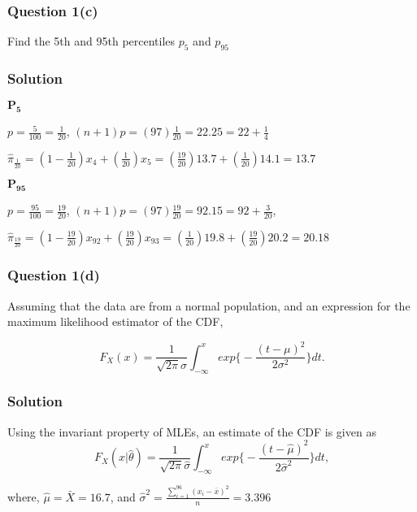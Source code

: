 \documentclass[]{article}
\begin{document}
\hypertarget{question-1c}{%
\subsubsection{Question 1(c)}\label{question-1c}}

Find the 5th and 95th percentiles \(p_5\) and \(p_{95}\)

\hypertarget{solution-2}{%
\subsubsection{Solution}\label{solution-2}}

\(\mathbf{P_5}\)

\(p=\frac{5}{100}=\frac{1}{20}\),
\((n+1)p=(97)\frac{1}{20}=22.25=22+\frac{1}{4}\)

\(\hat{\pi}_{\frac{1}{20}}=(1-\frac{1}{20})x_{4}+(\frac{1}{20})x_{5}=(\frac{19}{20})13.7+(\frac{1}{20})14.1=\mathbf{13.7}\)

\(\mathbf{P_{95}}\)

\(p=\frac{95}{100}=\frac{19}{20}\),
\((n+1)p=(97)\frac{19}{20}=92.15=92+\frac{3}{20}\),

\(\hat{\pi}_{\frac{19}{20}}=(1-\frac{19}{20})x_{92}+(\frac{19}{20})x_{93}=(\frac{1}{20})19.8+(\frac{19}{20})20.2=\mathbf{20.18}\)

\hypertarget{question-1d}{%
\subsubsection{Question 1(d)}\label{question-1d}}

Assuming that the data are from a normal population, and an expression
for the maximum likelihood estimator of the CDF,

\[F_X(x)=\frac{1}{\sqrt{2\pi}\sigma}\int_{-\infty}^xexp\Big\{ -\frac{(t-\mu)^2}{2\sigma^2}\Big\}dt.\]

\hypertarget{solution-3}{%
\subsubsection{Solution}\label{solution-3}}

Using the invariant property of MLEs, an estimate of the CDF is given as
\[F_X(x|\hat\theta)=\frac{1}{\sqrt{2\pi}\hat\sigma}\int_{-\infty}^xexp\Big\{ -\frac{(t-\hat\mu)^2}{2\hat\sigma^2}\Big\}dt,\]

where, \(\hat\mu=\bar X=16.7\), and
\(\hat\sigma^2=\frac{\sum_{i=1}^{96}(x_i-\bar x)^2}{n}=\mathbf{3.396}\)
\end{document}
